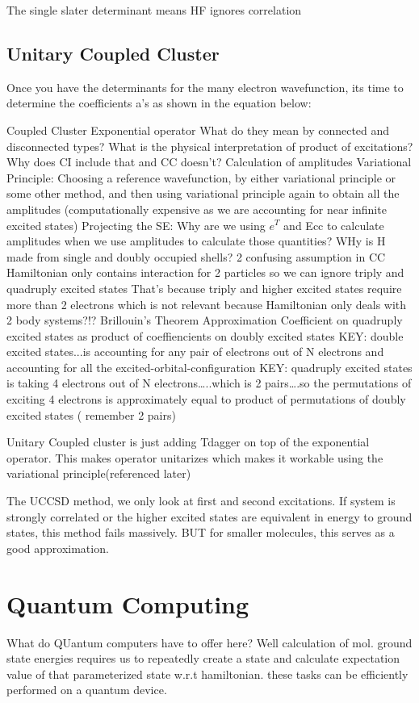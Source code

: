 \documentclass{article}
\begin{document}
The single slater determinant means HF ignores correlation

\subsection{Unitary Coupled Cluster}
Once you have the determinants for the many electron wavefunction, its time to determine the coefficients a’s as shown in the equation below:

Coupled Cluster
Exponential operator
What do they mean by connected and disconnected types? What is the physical interpretation of product of excitations? Why does CI include that and CC doesn’t?
Calculation of amplitudes
Variational Principle: Choosing a reference wavefunction, by either variational principle or some other method, and then using variational principle again to obtain all the amplitudes (computationally expensive as we are accounting for near infinite excited states)
Projecting the SE: Why are we using \(e^T\) and Ecc to calculate amplitudes when we use amplitudes to calculate those quantities? WHy is H made from single and doubly occupied shells?
2 confusing assumption in CC
Hamiltonian only contains interaction for 2 particles so we can ignore triply and quadruply excited states
That’s because triply and higher excited states require more than 2 electrons which is not relevant because Hamiltonian only deals with 2 body systems?!?
Brillouin’s Theorem
Approximation
Coefficient on quadruply excited states as product of coeffiencients on doubly excited states
KEY: double excited states...is accounting for any pair of electrons out of N electrons and accounting for all the excited-orbital-configuration
KEY: quadruply excited states is taking 4 electrons out of N electrons…..which is 2 pairs….so the permutations of exciting 4 electrons is approximately equal to product of permutations of doubly excited states ( remember 2 pairs)

Unitary Coupled cluster is just adding Tdagger on top of the exponential
operator. This makes operator unitarizes which makes it workable using
the variational principle(referenced later)

The UCCSD method, we only look at first and second excitations. If system is
strongly correlated or the higher excited states are equivalent in energy to
ground states, this method fails massively. BUT for smaller molecules, this
serves as a good approximation.

\section{Quantum Computing}
What do QUantum computers have to offer here? Well calculation of mol. ground
state energies requires us to repeatedly create a state and calculate
expectation value of that parameterized state w.r.t hamiltonian. these tasks
can be efficiently performed on a quantum device.
\end{document}
